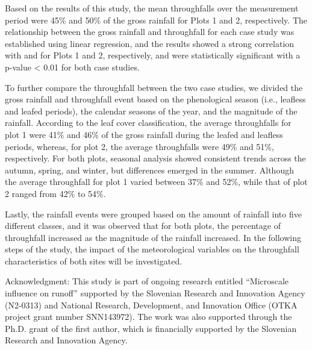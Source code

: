 Based on the results of this study, the mean throughfalls over the
measurement period were 45\% and 50\% of the gross rainfall for Plots
1 and 2, respectively. The relationship between the gross rainfall and
throughfall for each case study was established using linear
regression, and the results showed a strong correlation with and for
Plots 1 and 2, respectively, and were statistically significant with a
p-value < 0.01 for both case studies.

To further compare the throughfall between the two case studies, we divided the gross rainfall and
throughfall event based on the phenological season (i.e., leafless and leafed periods), the calendar
seasons of the year, and the magnitude of the rainfall. According to the leaf cover classification, the
average throughfalls for plot 1 were 41\% and 46\% of the gross rainfall during the leafed and leafless
periods, whereas, for plot 2, the average throughfalls were 49\% and 51\%, respectively. For both
plots, seasonal analysis showed consistent trends across the autumn, spring, and winter, but
differences emerged in the summer. Although the average throughfall for plot 1 varied between 37\%
and 52\%, while that of plot 2 ranged from 42\% to 54\%.

Lastly, the rainfall events were grouped based on the amount of rainfall into five different classes, and
it was observed that for both plots, the percentage of throughfall increased as the magnitude of the
rainfall increased. In the following steps of the study, the impact of the meteorological variables on
the throughfall characteristics of both sites will be investigated.

Acknowledgment: This study is part of ongoing research entitled “Microscale influence on runoff” supported by the Slovenian Research and Innovation Agency (N2-0313) and National Research, Development, and Innovation Office (OTKA project grant number SNN143972). The work was also supported through the Ph.D. grant of the first author, which is financially supported by the Slovenian Research and Innovation Agency.


